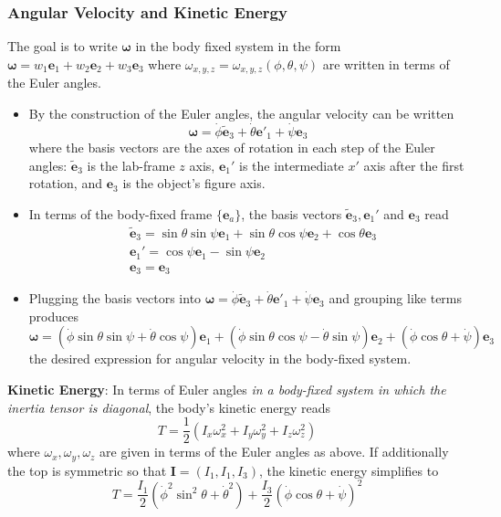 \documentclass[11pt, a4paper]{article}
\newcommand{\e}{\mathbf{e}} %
\begin{document}
\subsubsection{Angular Velocity and Kinetic Energy}
The goal is to write $ \bm{\omega} $ in the body fixed system in the form $ \bm{\omega} = w_1 \e_1 + w_2 \e_2 + w_3 \e_3 $ where $ \omega_{x,y,z} = \omega_{x,y,z}(\phi, \theta, \psi) $ are written in terms of the Euler angles.
\begin{itemize}
	\item By the construction of the Euler angles, the angular velocity can be written
	\begin{equation*}
		\bm{\omega} = \dot{\phi} \tilde{\e}_{3} + \dot{\theta} \e'_{1} + \dot{\psi} \e_{3}
	\end{equation*}
	where the basis vectors are the axes of rotation in each step of the Euler angles: $ \tilde{\e}_{3} $ is the lab-frame $ z $ axis, $ \e_{1}' $ is the intermediate $ x' $ axis after the first rotation, and $ \e_{3} $ is the object's figure axis.
	
	\item In terms of the body-fixed frame $ \{\e_{a} \} $, the basis vectors $ \tilde{\e}_{3}, \e_{1}' $ and $ \e_{3} $  read
	\begin{align*}
		&\tilde{\e}_{3} = \sin \theta \sin \psi \e_{1} + \sin \theta \cos \psi \e_{2} + \cos \theta \e_{3}\\
		&\e_{1}' = \cos \psi \e_{1} - \sin \psi \e_{2}\\
		&\e_{3} = \e_{3}
	\end{align*}
	\vspace{-10mm} %
	\item Plugging the basis vectors into $ \bm{\omega} = \dot{\phi} \tilde{\e}_{3} + \dot{\theta} \e'_{1} + \dot{\psi} \e_{3} $ and grouping like terms produces
	\begin{equation*}
		\bm{\omega} = (\dot \phi \sin \theta \sin \psi + \dot{\theta} \cos \psi) \e_{1} + (\dot{\phi} \sin \theta \cos \psi - \dot{\theta} \sin \psi) \e_{2} + (\dot{\phi } \cos \theta + \dot{\psi} ) \e_{3}
	\end{equation*}
	the desired expression for angular velocity in the body-fixed system.	

\end{itemize}

\textbf{Kinetic Energy}: In terms of Euler angles \textit{in a body-fixed system in which the inertia tensor is diagonal}, the body's kinetic energy reads
\begin{equation*}
	T = \frac{1}{2}\left(I_{x} \omega_{x}^2 + I_{y} \omega_{y}^{2} + I_{z} \omega_{z}^{2}\right)
\end{equation*}
where $ \omega_{x}, \omega_{y}, \omega_{z} $ are given in terms of the Euler angles as above. If additionally the top is symmetric so that $ \mathbf{I} = (I_1, I_1, I_3) $, the kinetic energy simplifies to
\begin{equation*}
	T = \frac{I_1}{2} \left (\dot{\phi}^2 \sin^2 \theta + \dot{\theta}^2\right ) + \frac{I_3}{2} \left (\dot{\phi} \cos \theta + \dot{\psi} \right )^2
\end{equation*}
\end{document}
